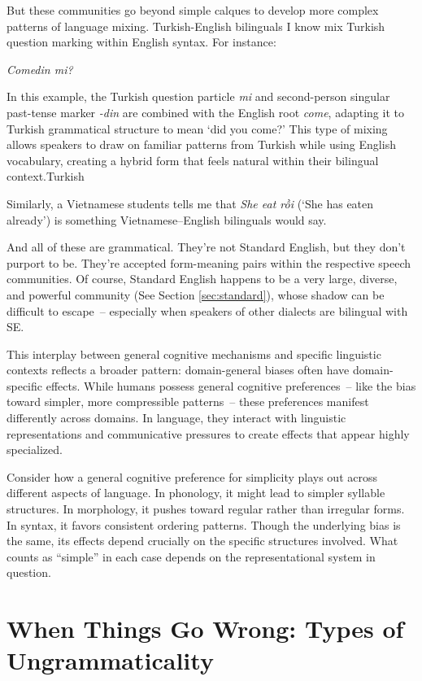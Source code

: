 But these communities go beyond simple calques to develop more complex patterns of language mixing. Turkish-English bilinguals I know mix Turkish question marking within English syntax. For instance:

\ea \textit{Comedin mi?} \z

In this example, the Turkish question particle \textit{mi} and second-person singular past-tense marker \textit{-din} are combined with the English root \textit{come}, adapting it to Turkish grammatical structure to mean `did you come?' This type of mixing allows speakers to draw on familiar patterns from Turkish while using English vocabulary, creating a hybrid form that feels natural within their bilingual context.Turkish

Similarly, a Vietnamese students tells me that \textit{She eat rồi} (`She has eaten already') is something Vietnamese--English bilinguals would say.

And all of these are grammatical. They're not Standard English, but they don't purport to be. They're accepted form-meaning pairs within the respective speech communities. Of course, Standard English happens to be a very large, diverse, and powerful community (See Section \ref{sec:standard}), whose shadow can be difficult to escape~-- especially when speakers of other dialects are bilingual with SE.

This interplay between general cognitive mechanisms and specific linguistic contexts reflects a broader pattern: domain-general biases often have domain-specific effects. While humans possess general cognitive preferences~-- like the bias toward simpler, more compressible patterns~-- these preferences manifest differently across domains. In language, they interact with linguistic representations and communicative pressures to create effects that appear highly specialized.

Consider how a general cognitive preference for simplicity plays out across different aspects of language. In phonology, it might lead to simpler syllable structures. In morphology, it pushes toward regular rather than irregular forms. In syntax, it favors consistent ordering patterns. Though the underlying bias is the same, its effects depend crucially on the specific structures involved. What counts as ``simple'' in each case depends on the representational system in question.

\section{When Things Go Wrong: Types of Ungrammaticality}

